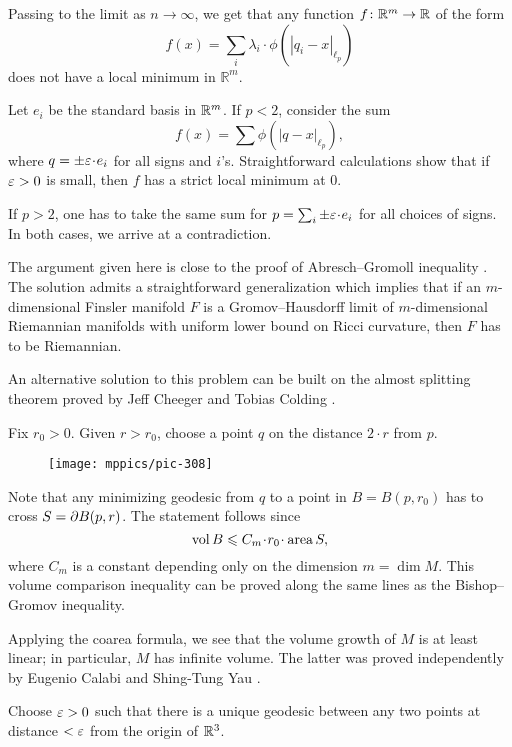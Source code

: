 Passing to the limit as $n\to \infty$, we get that any function $f\:\mathbb{R}^m\z\to\mathbb{R}$
of the form 
$$f(x)=\sum_i\lambda_i\cdot\phi(|q_i-x|_{\ell_p})$$
does not have a local minimum in $\mathbb{R}^m$.

Let $e_i$ be the standard basis in $\mathbb{R}^m$. 
If $p<2$, consider the sum 
$$f(x)=\sum\phi(|q-x|_{\ell_p}),$$
where $q=\pm\eps\cdot e_i$ for all signs and $i$'s.
Straightforward calculations show that if $\varepsilon>0$ is small, then $f$
has a strict local minimum at $0$.

If $p>2$, one has to take the same sum for  $p=\sum_i\pm\eps\cdot e_i$ for all choices of signs.
In both cases, we arrive at a contradiction.
\qeds

The argument given here is close to the proof of Abresch--Gromoll inequality \cite{abresch-gromoll}.
The solution admits a straightforward generalization which implies that if an $m$-dimensional  Finsler manifold $F$ is a Gromov--Hausdorff limit of $m$-dimensional Riemannian manifolds with uniform lower bound on Ricci curvature, then $F$ has to be Riemannian.

An alternative solution to this problem can be built on the almost splitting theorem proved by  Jeff Cheeger and Tobias Colding \cite{cheeger-colding}.





Fix $r_0>0$.
Given $r>r_0$, choose a point $q$ on the distance $2\cdot r$ from $p$.

\begin{wrapfigure}{r}{35 mm}
\vskip-5mm
\centering
\texttt{[image: mppics/pic-308]}
\end{wrapfigure}

Note that any minimizing geodesic from $q$ to a point in $B=B(p,r_0)$
has to cross $S\z=\partial B(p,r)$.
The statement follows since  
\[\vol B\le C_m\cdot r_0\cdot \area S,\]
where $C_m$ is a constant depending only on the dimension $m=\dim M$.
This volume comparison inequality can be proved along the same lines as the Bishop--Gromov inequality.
\qeds


Applying the coarea formula, 
we see that the volume growth of $M$ is at least linear; 
in particular, $M$ has infinite volume.
The latter was proved independently 
by Eugenio Calabi 
and Shing-Tung Yau \cite{calabi,yau-ricci}.



Choose $\varepsilon>0$ such that there is a unique geodesic between any two points at distance $<\varepsilon$ from the origin of $\mathbb{R}^3$.

